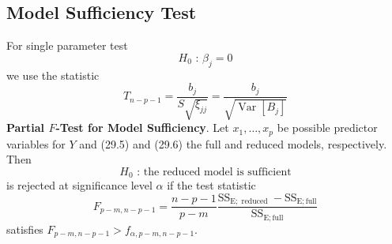 \documentclass[a4paper,12pt]{article}
\begin{document}
\subsection{Model Sufficiency Test}
For single parameter test
$$H_0 \text{ : } \beta_j=0$$
we use the statistic
\begin{equation}
T_{n-p-1}=\dfrac{b_j}{S\sqrt{\xi_{jj}}} = \dfrac{b_j}{\sqrt{\operatorname{Var}[B_j]}}
\end{equation}
\textbf{Partial $F$-Test for Model Sufficiency}. Let $x_1, \ldots, x_p$ be possible predictor variables for $Y$ and (29.5) and (29.6) the full and reduced models, respectively. Then
$$H_0 \text{ : the reduced model is sufficient}$$
is rejected at significance level $\alpha$ if the test statistic
$$
F_{p-m, n-p-1}=\frac{n-p-1}{p-m} \frac{\mathrm{SS}_{\mathrm{E} ; \text { reduced }}-\mathrm{SS}_{\mathrm{E} ; \mathrm{full}}}{\mathrm{SS}_{\mathrm{E} ; \mathrm{full}}}
$$
satisfies $F_{p-m, n-p-1}>f_{\alpha, p-m, n-p-1}$.
\end{document}
